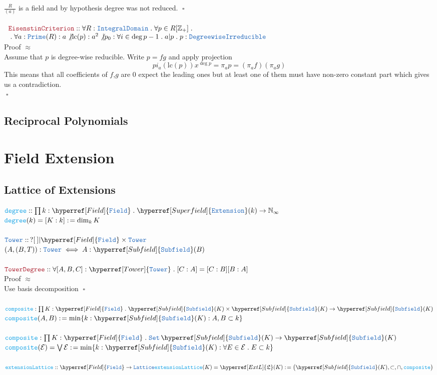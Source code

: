 \documentclass[12pt]{article}
\newcommand{\TYPE}[1]{\textcolor{NavyBlue}{\mathtt{#1}}}
\newcommand{\FUNC}[1]{\textcolor{Cerulean}{\mathtt{#1}}}
\newcommand{\THM}[1]{\textcolor{Maroon}{\mathtt{#1}}}
\renewcommand{\.}{\; . \;}
\newcommand{\de}{: \kern 0.1pc =}
\newcommand{\NNInt}{\mathbb{Z}_{+} }
\newcommand{\Nat}{\mathbb{N} }
\newcommand{\Set}{\TYPE{Set}}
\newcommand{\QED}{\; \square}
\newcommand{\IntD}{\TYPE{IntegralDomain}}
\newcommand{\Prime}{\TYPE{Prime}}
\newcommand{\DWIrr}{\TYPE{DegreewiseIrreducible}}
\newcommand{\lc}{\mathrm{lc}}
\newcommand{\Field}{\hyperref[Field]{\TYPE{Field}}}
\newcommand{\Superfield}{\hyperref[Superfield]{\TYPE{Extension}}}
\newcommand{\Subfield}{\hyperref[Subfield]{\TYPE{Subfield}}}
\newcommand{\Tower}{\hyperref[Tower]{\TYPE{Tower}}}
\newcommand{\EL}{\hyperref[ExtL]{\mathfrak{L}}}
\begin{document}
  $\frac{R}{(a)}$ is a field and by hypothesis degree was not reduced.  $\QED$
  \\ \\
  $
  \begin{array}{l}  
  \THM{EisenstinCriterion} :: \forall R : \IntD \. 
   \forall p \in R[\NNInt] \. \\
  \.\forall a : \Prime(R)  : a \not | \lc(p) : a^2 \not| p_0 : 
   \forall i \in \deg p - 1 \. a | p \. p : \DWIrr
  \end{array}
  $
  \\ 
  Proof $\approx$ \\
  Assume that $p$ is degree-wise reducible. Write $p = fg$ and apply projection
  $$
       pi_a(\lc(p))x^{\deg p}    = \pi_a p = (\pi_a f)(\pi_a g )
  $$
  This means that all coefficients of  $f$,$g$ are $0$ expect the leading ones but at least one of them must have non-zero constant part which gives us a contradiction. \\
 $ \QED$
   \newpage
 \subsection{Reciprocal Polynomials}
 \newpage
 \section{Field Extension}
 \subsection{Lattice of Extensions}
  $\FUNC{degree} :: \prod k : \Field \. \Superfield(k) \to \Nat_\infty $ \\
  $ \FUNC{degree}(k) = [K : k] \de \dim_k K$
  \\ \\
  $\TYPE{Tower} :: \,  ? [\:] | \Field \times \TYPE{Tower} $ \\
  $ (A,(B,T)) : \TYPE{Tower} \iff A : \Subfield(B) $\label{Tower} \\
  \\
  $\THM{TowerDegree} :: \forall [A,B,C] : \Tower \. [C : A] = [C : B][B : A]$
  \\
  Proof $\approx$ \\
  Use basis decomposition $\QED$ 
  \\ \\
   $\FUNC{composite} : \prod K : \Field \. \Subfield(K) \times \Subfield(K) \to \Subfield(K) $\\
   $
    \FUNC{composite}(A,B) \de \min \{ k : \Subfield(K)  : A,B \subset k  \}
   $
  \\ \\
   $\FUNC{composite} : \prod K : \Field \. \Set \, \Subfield(K) \to \Subfield(K) $\\
   $
    \FUNC{composite}(\mathcal{E}) = \bigvee \mathcal{E}\de \min \{ k : \Subfield(K) : \forall E \in \mathcal{E} \. E \subset k  \}
   $
   \\ \\
   $
    \FUNC{extensionLattice} :: \Field \to \TYPE{Lattice} \\
    \FUNC{extensionLattice}(K) = \EL(K)\de \big(\Subfield(K),\subset,\cap,\FUNC{composite} \big)   
   $ \label{ExtL}
   \newpage
\end{document}
